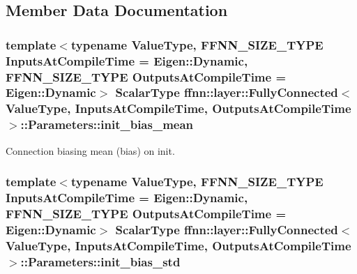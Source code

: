 \subsection{Member Data Documentation}
\hypertarget{structffnn_1_1layer_1_1_fully_connected_1_1_parameters_ada734ee2cffa841b4502f10c834571ba}{
\subsubsection[{init\-\_\-bias\-\_\-mean}]{\setlength{\rightskip}{0pt plus 5cm}template$<$typename Value\-Type, F\-F\-N\-N\-\_\-\-S\-I\-Z\-E\-\_\-\-T\-Y\-P\-E Inputs\-At\-Compile\-Time = Eigen\-::\-Dynamic, F\-F\-N\-N\-\_\-\-S\-I\-Z\-E\-\_\-\-T\-Y\-P\-E Outputs\-At\-Compile\-Time = Eigen\-::\-Dynamic$>$ {\bf Scalar\-Type} {\bf ffnn\-::layer\-::\-Fully\-Connected}$<$ Value\-Type, Inputs\-At\-Compile\-Time, Outputs\-At\-Compile\-Time $>$\-::Parameters\-::init\-\_\-bias\-\_\-mean}}\label{structffnn_1_1layer_1_1_fully_connected_1_1_parameters_ada734ee2cffa841b4502f10c834571ba}


Connection biasing mean (bias) on init. 

\hypertarget{structffnn_1_1layer_1_1_fully_connected_1_1_parameters_a9e925704885ce05e37fb6bf53a1c57c4}{
\subsubsection[{init\-\_\-bias\-\_\-std}]{\setlength{\rightskip}{0pt plus 5cm}template$<$typename Value\-Type, F\-F\-N\-N\-\_\-\-S\-I\-Z\-E\-\_\-\-T\-Y\-P\-E Inputs\-At\-Compile\-Time = Eigen\-::\-Dynamic, F\-F\-N\-N\-\_\-\-S\-I\-Z\-E\-\_\-\-T\-Y\-P\-E Outputs\-At\-Compile\-Time = Eigen\-::\-Dynamic$>$ {\bf Scalar\-Type} {\bf ffnn\-::layer\-::\-Fully\-Connected}$<$ Value\-Type, Inputs\-At\-Compile\-Time, Outputs\-At\-Compile\-Time $>$\-::Parameters\-::init\-\_\-bias\-\_\-std}}\label{structffnn_1_1layer_1_1_fully_connected_1_1_parameters_a9e925704885ce05e37fb6bf53a1c57c4}


